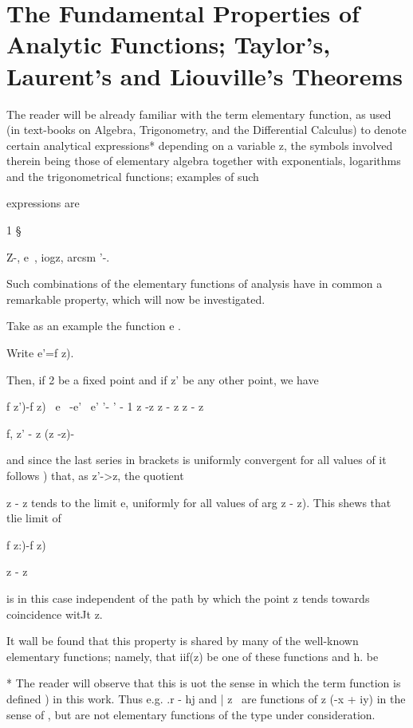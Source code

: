 %
%
\chapter{The Fundamental Properties of Analytic Functions;
Taylor's, Laurent's and Liouville's Theorems}


The reader will be already familiar with the term elementary function,
as used (in text-books on Algebra, Trigonometry, and the Differential
Calculus) to denote certain analytical expressions* depending on a
variable z, the symbols involved therein being those of elementary
algebra together with exponentials, logarithms and the trigonometrical
functions; examples of such

expressions are

1  §

Z-, e~, iogz, arcsm '-.

Such combinations of the elementary functions of analysis have in
common a remarkable property, which will now be investigated.

Take as an example the function e .

Write e'=f z).

Then, if 2 be a fixed point and if z' be any other point, we have

f z')-f z) \ e~ -e' \, e' '- ' - 1 z -z z - z z - z

f, z' - z (z -z)-

and since the last series in brackets is uniformly convergent for all
values of it follows ) that, as z'->z, the quotient

z - z tends to the limit e, uniformly for all values of arg z - z).
This shews that tlie limit of

f z:)-f z)

z - z

is in this case independent of the path by which the point z tends
towards coincidence witJt z.

It wall be found that this property is shared by many of the
well-known elementary functions; namely, that iif(z) be one of these
functions and h. be

* The reader will observe that this is uot the sense in which the term
function is defined ) in this work. Thus e.g. .r - hj and | z \
are functions of z (-x + iy) in the sense of , but are not
elementary functions of the type under consideration.

